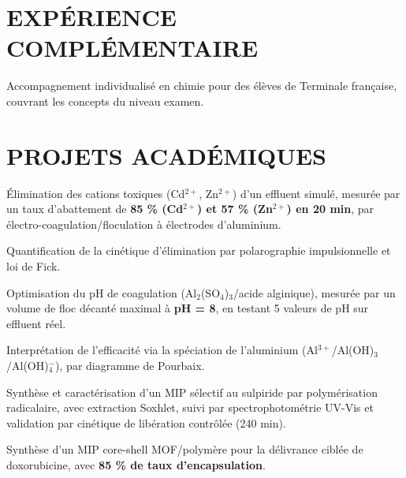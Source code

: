 \documentclass[10pt]{article}
\begin{document}
\section{EXPÉRIENCE COMPLÉMENTAIRE}
\begin{bul}
\item Accompagnement individualisé en chimie pour des élèves de Terminale française, couvrant les concepts du niveau examen.
\end{bul}

\section{PROJETS ACADÉMIQUES}
\begin{bul}
\item Élimination des cations toxiques (Cd$^{2+}$, Zn$^{2+}$) d'un effluent simulé, mesurée par un taux d'abattement de \textbf{85 \% (Cd$^{2+}$) et 57 \% (Zn$^{2+}$) en 20 min}, par électro-coagulation/floculation à électrodes d'aluminium.
\item Quantification de la cinétique d'élimination par polarographie impulsionnelle et loi de Fick.
\end{bul}
\begin{bul}
\item Optimisation du pH de coagulation (Al$_2$(SO$_4$)$_3$/acide alginique), mesurée par un volume de floc décanté maximal à \textbf{pH = 8}, en testant 5 valeurs de pH sur effluent réel.
\item Interprétation de l'efficacité via la spéciation de l'aluminium (Al$^{3+}$/Al(OH)$_3$/Al(OH)$_4^-$), par diagramme de Pourbaix.
\end{bul}
\begin{bul}
\item Synthèse et caractérisation d'un MIP sélectif au sulpiride par polymérisation radicalaire, avec extraction Soxhlet, suivi par spectrophotométrie UV-Vis et validation par cinétique de libération contrôlée (240 min).
\item Synthèse d'un MIP core-shell MOF/polymère pour la délivrance ciblée de doxorubicine, avec \textbf{85 \% de taux d'encapsulation}.
\end{bul}
\end{document}
